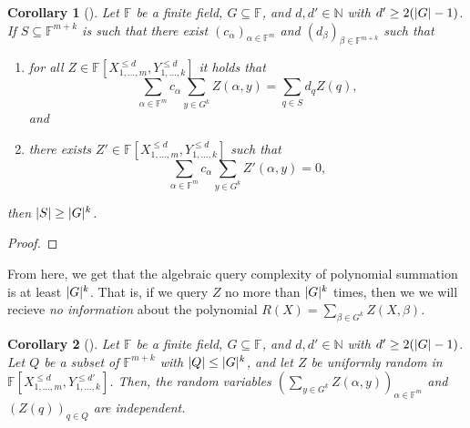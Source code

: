 \documentclass[english,12pt]{reedthesis}
\theoremstyle{plain}
\newtheorem{cor}[cor]{Corollary}
\theoremstyle{definition}
\theoremstyle{remark}
\DeclarePairedDelimiter{\abs}{\lvert}{\rvert}
\begin{document}
\begin{cor}[{\cite[Corollary 12.2]{CFGS22}}]
  Let $\mathbb{F}$ be a finite field, $G \subseteq \mathbb{F}$, and $d, d' \in \mathbb{N}$ with
  $d' \ge 2(\abs{G} - 1)$. If $S \subseteq \mathbb{F}^{m+k}$ is such that there exist
  $(c_{\alpha})_{\alpha \in \mathbb{F}^{m}}$ and $(d_{\beta})_{\beta \in \mathbb{F}^{m+k}}$ such that
  \begin{enumerate}
    \item for all $Z \in \mathbb{F}[X_{1, \ldots, m}^{\le d}, Y_{1, \ldots, k}^{\le d}]$ it
          holds that
          \begin{equation}
            \sum_{\alpha \in \mathbb{F}^{m}}c_{\alpha}\sum_{y \in G^{k}}Z(\alpha, y) = \sum_{q \in S}d_{q}Z(q),
          \end{equation}
          and
    \item there exists $Z' \in \mathbb{F}[X_{1, \ldots, m}^{\le d}, Y_{1, \ldots, k}^{\le d}]$
          such that
          \begin{equation}
            \sum_{\alpha \in \mathbb{F}^{m}}c_{\alpha}\sum_{y \in G^{k}}Z'(\alpha, y) = 0,
          \end{equation}
  \end{enumerate}
  then $\abs{S} \ge \abs{G}^{k}$.
\end{cor}

\begin{proof}
\end{proof}

From here, we get that the algebraic query complexity of polynomial summation is
at least $\abs{G}^{k}$. That is, if we query $Z$ no more than $\abs{G}^{k}$
times, then we we will recieve \emph{no information} about the polynomial
$R(X) = \sum_{\beta \in G^{k}}Z(X, \beta)$.

\begin{cor}[{\cite[Corollary 12.3]{CFGS22}}]\label{cor:indep-ensemble}
  Let $\mathbb{F}$ be a finite field, $G \subseteq \mathbb{F}$, and $d, d' \in \mathbb{N}$ with
  $d' \ge 2(\abs{G} - 1)$. Let $Q$ be a subset of $\mathbb{F}^{m+k}$ with
  $\abs{Q} \le \abs{G}^{k}$, and let $Z$ be uniformly random in
  $\mathbb{F}[X_{1, \ldots, m}^{\le d}, Y_{1, \ldots, k}^{\le d'}]$. Then, the random
  variables $(\sum_{y \in G^{k}}Z(\alpha, y))_{\alpha \in \mathbb{F}^{m}}$ and $(Z(q))_{q \in Q}$
  are independent.
\end{cor}
\end{document}
